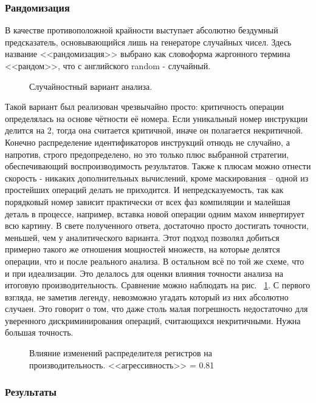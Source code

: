 \documentclass[a4paper,12pt,titlepage]{article}
\newcommand*{\fig}[1]{рис. ~{\ref{fig:#1}}}
\begin{document}
\subsubsection{Рандомизация}

В качестве противоположной крайности выступает абсолютно бездумный предсказатель, основывающийся лишь на генераторе случайных чисел. Здесь название <<рандомизация>> выбрано как словоформа жаргонного термина <<рандом>>, что с английского random - случайный.
\begin{figure}[!h]

\caption{Случайностный вариант анализа.}
\label{fig:random}
\end{figure}
Такой вариант был реализован чрезвычайно просто: критичность операции определялась на основе чётности её номера. Если уникальный номер инструкции делится на 2, тогда она считается критичной, иначе он полагается некритичной. Конечно распределение идентификаторов инструкций отнюдь не случайно, а напротив, строго предопределено, но это только плюс выбранной стратегии, обеспечивающий воспроизводимость результатов. Также к плюсам можно отнести скорость - никаких дополнительных вычислений, кроме маскирования -- одной из простейших операций делать не приходится. И непредсказуемость, так как порядковый номер зависит практически от всех фаз компиляции и малейшая деталь в процессе, например, вставка новой операции одним махом инвертирует всю картину. В свете полученного ответа, достаточно просто достигать точности, меньшей, чем у аналитического варианта.
Этот подход позволял добиться примерно такого же отношения мощностей множеств, на которые делятся операции, что и после реального анализа. В остальном всё по той же схеме, что и при идеализации. Это делалось для оценки влияния точности анализа на итоговую производительность. Сравнение можно наблюдать на \fig{random}. С первого взгляда, не заметив легенду, невозможно угадать который из них абсолютно случаен. Это говорит о том, что даже столь малая погрешность недостаточно для уверенного дискриминирования операций, считающихся некритичными. Нужна большая точность.

\begin{figure}[!h]

\caption{Влияние изменений распределителя регистров на производительность. <<агрессивность>> = 0.81 }
\label{fig:positive-perf}
\end{figure}

\subsubsection{Результаты}
\end{document}
